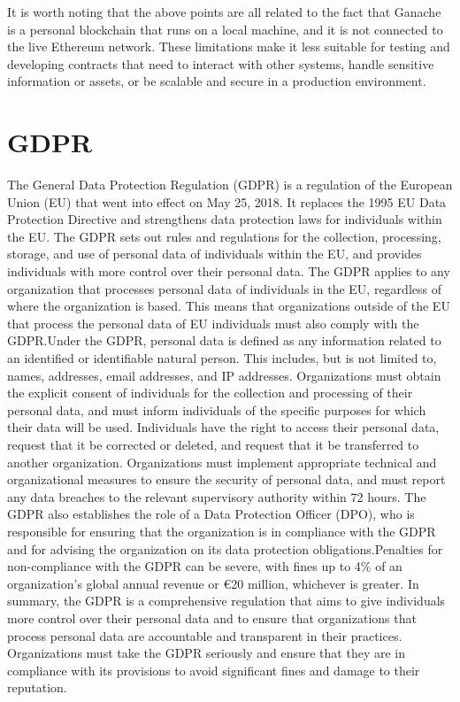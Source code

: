 \documentclass[target=mst,aauheader=]{thud}
\begin{document}
It is worth noting that the above points are all related to the fact that Ganache is a personal blockchain that runs on a local machine, and it is not connected to the live Ethereum network. These limitations make it less suitable for testing and developing contracts that need to interact with other systems, handle sensitive information or assets, or be scalable and secure in a production environment.

\chapter{GDPR}

The General Data Protection Regulation (GDPR) is a regulation of the European Union (EU) that went into effect on May 25, 2018. It replaces the 1995 EU Data Protection Directive and strengthens data protection laws for individuals within the EU. The GDPR sets out rules and regulations for the collection, processing, storage, and use of personal data of individuals within the EU, and provides individuals with more control over their personal data.
The GDPR applies to any organization that processes personal data of individuals in the EU, regardless of where the organization is based. This means that organizations outside of the EU that process the personal data of EU individuals must also comply with the GDPR.Under the GDPR, personal data is defined as any information related to an identified or identifiable natural person. This includes, but is not limited to, names, addresses, email addresses, and IP addresses.
Organizations must obtain the explicit consent of individuals for the collection and processing of their personal data, and must inform individuals of the specific purposes for which their data will be used. Individuals have the right to access their personal data, request that it be corrected or deleted, and request that it be transferred to another organization.
Organizations must implement appropriate technical and organizational measures to ensure the security of personal data, and must report any data breaches to the relevant supervisory authority within 72 hours.
The GDPR also establishes the role of a Data Protection Officer (DPO), who is responsible for ensuring that the organization is in compliance with the GDPR and for advising the organization on its data protection obligations.Penalties for non-compliance with the GDPR can be severe, with fines up to 4\% of an organization's global annual revenue or €20 million, whichever is greater.
In summary, the GDPR is a comprehensive regulation that aims to give individuals more control over their personal data and to ensure that organizations that process personal data are accountable and transparent in their practices. Organizations must take the GDPR seriously and ensure that they are in compliance with its provisions to avoid significant fines and damage to their reputation.
\end{document}
